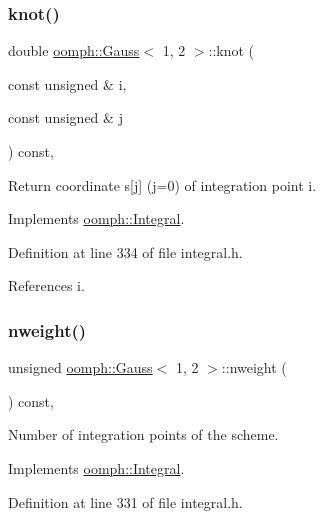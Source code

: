 \subsubsection{\texorpdfstring{knot()}{knot()}}
{\footnotesize\ttfamily double \hyperlink{classoomph_1_1Gauss}{oomph\+::\+Gauss}$<$ 1, 2 $>$\+::knot (\begin{DoxyParamCaption}\item[{const unsigned \&}]{i,  }\item[{const unsigned \&}]{j }\end{DoxyParamCaption}) const\hspace{0.3cm}{\ttfamily [inline]}, {\ttfamily [virtual]}}



Return coordinate s\mbox{[}j\mbox{]} (j=0) of integration point i. 



Implements \hyperlink{classoomph_1_1Integral_a1a2122f99a87c18649bafdd9ed739758}{oomph\+::\+Integral}.



Definition at line 334 of file integral.\+h.



References i.

\mbox{\label{classoomph_1_1Gauss_3_011_00_012_01_4_ace866a6cae8c2180b97b2eea315975df}} 
\subsubsection{\texorpdfstring{nweight()}{nweight()}}
{\footnotesize\ttfamily unsigned \hyperlink{classoomph_1_1Gauss}{oomph\+::\+Gauss}$<$ 1, 2 $>$\+::nweight (\begin{DoxyParamCaption}{ }\end{DoxyParamCaption}) const\hspace{0.3cm}{\ttfamily [inline]}, {\ttfamily [virtual]}}



Number of integration points of the scheme. 



Implements \hyperlink{classoomph_1_1Integral_a1a270de9d99a1fcf1d25a6c1017f65fa}{oomph\+::\+Integral}.



Definition at line 331 of file integral.\+h.

